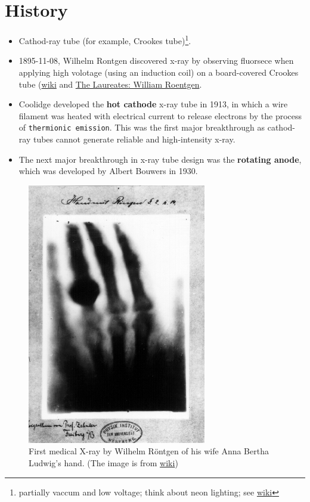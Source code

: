 \documentclass[]{book}
\providecommand{\tightlist}{%
  \setlength{\itemsep}{0pt}\setlength{\parskip}{0pt}}
\let\rmarkdownfootnote\footnote%
\def\footnote{\protect\rmarkdownfootnote}
\theoremstyle{definition}
\theoremstyle{definition}
\theoremstyle{definition}
\theoremstyle{remark}
\begin{document}
\section{History}\label{history}

\begin{itemize}
\tightlist
\item
  Cathod-ray tube (for example, Crookes tube)\footnote{partially vaccum
    and low voltage; think about neon lighting; see
    \href{https://en.wikipedia.org/wiki/Crookes_tube}{wiki}}.
\item
  1895-11-08, Wilhelm Rontgen discovered x-ray by observing fluorsece
  when applying high volotage (using an induction coil) on a
  board-covered Crookes tube
  (\href{https://en.wikipedia.org/wiki/Wilhelm_Röntgen}{wiki} and
  \href{https://www.youtube.com/watch?v=qVn3mgt8Two}{The Laureates:
  William Roentgen}.
\item
  Coolidge developed the \textbf{hot cathode} x-ray tube in 1913, in
  which a wire filament was heated with electrical current to release
  electrons by the process of \texttt{thermionic\ emission}. This was
  the first major breakthrough as cathod-ray tubes cannot generate
  reliable and high-intensity x-ray.
\item
  The next major breakthrough in x-ray tube design was the
  \textbf{rotating anode}, which was developed by Albert Bouwers in
  1930.
\end{itemize}

\begin{figure}
\centering
\includegraphics{figures/x-ray_hand.jpg}
\caption{First medical X-ray by Wilhelm Röntgen of his wife Anna Bertha
Ludwig's hand. (The image is from
\href{https://en.wikipedia.org/wiki/Wilhelm_Röntgen}{wiki})}
\end{figure}
\end{document}
